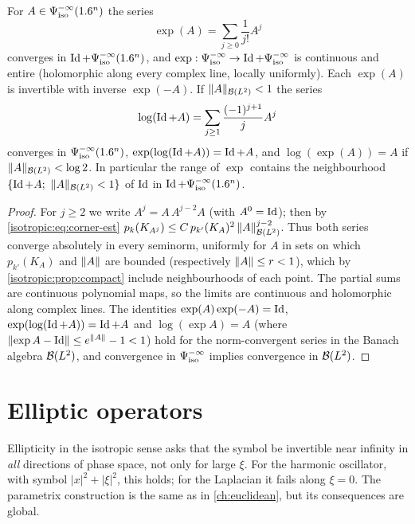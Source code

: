 \begin{proposition}\label{isotropic:prop:exp-log}
For $A\in\Psi^{-\infty}_{\mathrm{iso}}(1.6^n)$ the series
\begin{equation*}
  \exp(A)=\sum_{j\ge0}\frac1{j!}A^j
\end{equation*}
converges in $\operatorname{Id}+\Psi^{-\infty}_{\mathrm{iso}}(1.6^n)$, and $\exp:\Psi^{-\infty}_{\mathrm{iso}}\to\operatorname{Id}+\Psi^{-\infty}_{\mathrm{iso}}$
is continuous and entire (holomorphic along every complex line, locally
uniformly). Each $\exp(A)$ is invertible with inverse $\exp(-A)$. If
$\lVert A\rVert_{\mathcal{B}(L^2)}<1$ the series
\begin{equation*}
  \log(\operatorname{Id}+A)=\sum_{j\ge1}\frac{(-1)^{j+1}}{j}A^j
\end{equation*}
converges in $\Psi^{-\infty}_{\mathrm{iso}}(1.6^n)$, $\exp(\log(\operatorname{Id}+A))=\operatorname{Id}+A$, and
$\log(\exp(A))=A$ if $\lVert A\rVert_{\mathcal{B}(L^2)}<\log2$. In particular the range of
$\exp$ contains the neighbourhood $\{\Id+A;\ \norm{A}_{\Lin(L^2)}<1\}$ of $\operatorname{Id}$
in $\operatorname{Id}+\Psi^{-\infty}_{\mathrm{iso}}(1.6^n)$.
\end{proposition}
\begin{proof}
For $j\ge2$ we write $A^j=A\,A^{j-2}A$ (with $A^0=\operatorname{Id}$); then by
\eqref{isotropic:eq:corner-est}
$p_k(K_{A^j})\le C\,p_{k'}(K_A)^2\,\lVert A\rVert^{j-2}_{\mathcal{B}(L^2)}$. Thus both series
converge absolutely in every seminorm, uniformly for $A$ in sets on which
$p_{k'}(K_A)$ and $\lVert A\rVert$ are bounded (respectively $\lVert A\rVert\le r<1$), which by
\cref{isotropic:prop:compact} include neighbourhoods of each point. The
partial sums are continuous polynomial maps, so the limits are continuous and
holomorphic along complex lines. The identities $\exp(A)\exp(-A)=\operatorname{Id}$,
$\exp(\log(\operatorname{Id}+A))=\operatorname{Id}+A$ and $\log(\exp A)=A$ (where
$\lVert \exp A-\operatorname{Id}\rVert\le e^{\lVert A\rVert}-1<1$) hold for the norm-convergent series in
the Banach algebra $\mathcal{B}(L^2)$, and convergence in $\Psi^{-\infty}_{\mathrm{iso}}$ implies
convergence in $\mathcal{B}(L^2)$.
\end{proof}

\section{Elliptic operators}\label{isotropic:sec:elliptic}

Ellipticity in the isotropic sense asks that the symbol be invertible near
infinity in \emph{all} directions of phase space, not only for large $\xi$.
For the harmonic oscillator, with symbol $|x|^2+|\xi|^2$, this holds; for
the Laplacian it fails along $\xi=0$. The parametrix construction is the
same as in \cref{ch:euclidean}, but its consequences are global.

